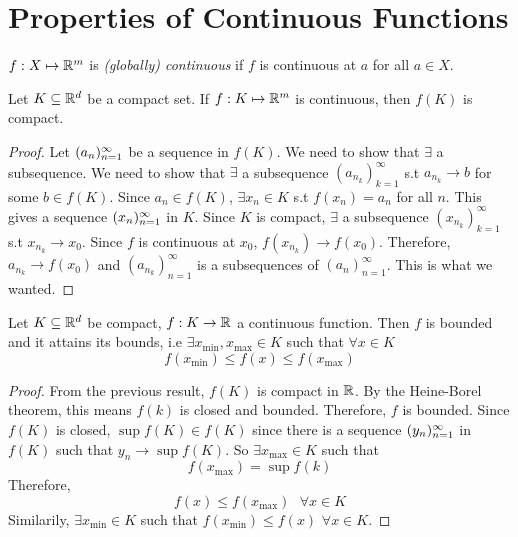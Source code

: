 \documentclass[openany]{report}
\begin{document}
    \section{Properties of Continuous Functions}
    $f: X \mapsto \mathbb{R}^m$ is \emph{(globally) continuous} if $f$ is continuous at $a$ for all $a \in X$.
    \begin{theorem}
        Let $K \subseteq \mathbb{R}^d$ be a compact set. If $f: K \mapsto \mathbb{R}^m$ is continuous, then $f(K)$ is compact. 
    \end{theorem}
    \begin{proof}
        Let $({a}_n)_{n=1}^\infty$ be a sequence in $f(K)$. We need to show that $\exists$ a subsequence. We need to show that $\exists$ a subsequence $(a_{n_k})_{k=1}^\infty$ s.t $a_{n_k} \rightarrow b$ for some $b \in f(K)$. Since $a_n \in f(K)$, $\exists x_n \in K$ s.t $f(x_n) = a_n$ for all $n$. This gives a sequence $({x}_n)_{n=1}^\infty$ in $K$. Since $K$ is compact, $\exists$ a subsequence $(x_{n_k})_{k=1}^\infty$ s.t $x_{n_k} \rightarrow x_0$. Since $f$ is continuous at $x_0$, $f(x_{n_k}) \rightarrow f(x_0)$. Therefore, $a_{n_k} \rightarrow f(x_0)$ and $(a_{n_k})_{n=1}^\infty$ is a subsequences of $(a_n)_{n=1}^\infty$. This is what we wanted.
    \end{proof} 
\begin{corollary}
    Let $K \subseteq \mathbb{R}^d$ be compact, $f: K \rightarrow \mathbb{R}$ a continuous function. Then $f$ is bounded and it attains its bounds, i.e $\exists x_{\min}, x_{\max} \in K$ such that $\forall x \in K$
    \[f(x_{\min}) \leq f(x) \leq f(x_{\max})\]
\end{corollary}
\begin{proof}
    From the previous result, $f(K)$ is compact in $\mathbb{R}$. By the Heine-Borel theorem, this means $f(k)$ is closed and bounded. Therefore, $f$ is bounded. Since $f(K)$ is closed, $\sup f(K) \in f(K)$ since there is a sequence $({y}_n)_{n=1}^\infty$ in $f(K)$ such that $y_n \rightarrow \sup f(K)$. So $\exists x_{\max} \in K$ such that 
    \[f(x_{\max}) = \sup f(k)\]
    Therefore, 
    \[f(x) \leq f(x_{\max}) \text{  } \forall x \in K\]
    Similarily, $\exists x_{\min} \in K$ such that $f(x_{\min}) \leq f(x)$ $\forall x \in K$. 
\end{proof}

\end{document}
